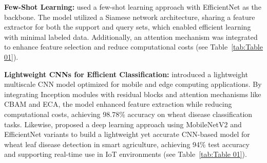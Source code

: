 \textbf{Few-Shot Learning:} \parencite{alharbi2023wheat} used a few-shot learning approach with EfficientNet as the backbone. The model utilized a Siamese network architecture, sharing a feature extractor for both the support and query sets, which enabled efficient learning with minimal labeled data. Additionally, an attention mechanism was integrated to enhance feature selection and reduce computational costs (see Table~\ref{tab:Table 01}).

\textbf{Lightweight CNNs for Efficient Classification:} \parencite{fang2023lightweight} introduced a lightweight multiscale CNN model optimized for mobile and edge computing applications. By integrating Inception modules with residual blocks and attention mechanisms like CBAM and ECA, the model enhanced feature extraction while reducing computational costs, achieving 98.78\% accuracy on wheat disease classification tasks​. Likewise,\parencite{jouini2023wheat} proposed a deep learning approach using MobileNetV2 and EfficientNet variants to build a lightweight yet accurate CNN-based model for wheat leaf disease detection in smart agriculture, achieving 94\% test accuracy and supporting real-time use in IoT environments (see Table~\ref{tab:Table 01}).

